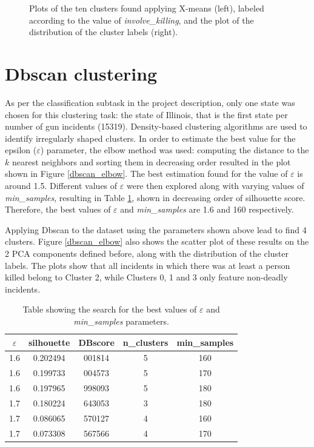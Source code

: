 \documentclass[10pt,a4paper]{report}
\begin{document}
\begin{figure}[h]
\begin{minipage}{0.25\textwidth}
		\vspace{0.8cm}
	\end{minipage}
		\caption{Plots of the ten clusters found applying X-means (left), labeled according to the value of \textit{involve\_killing}, and the plot of the distribution of the cluster labels (right).}
		\label{xmeans_killing}
\end{figure}

\section{Dbscan clustering}

As per the classification subtask in the project description, only one state was chosen for this clustering task: the state of Illinois, that is the first state per number of gun incidents (15319).
Density-based clustering algorithms are used to identify irregularly shaped clusters.
In order to estimate the best value for the epsilon ($\varepsilon$) parameter, the elbow method was used: computing the distance to the $k$ nearest neighbors and sorting them in decreasing order resulted in the plot shown in Figure \ref{dbscan_elbow}.
The best estimation found for the value of $\varepsilon$ is around 1.5.
Different values of $\varepsilon$ were then explored along with varying values of \textit{min\_samples}, resulting in Table \ref{table02}, shown in decreasing order of silhouette score.
Therefore, the best values of $\varepsilon$ and \textit{min\_samples} are 1.6 and 160 respectively.

Applying Dbscan to the dataset using the parameters shown above lead to  find 4 clusters.
Figure \ref{dbscan_elbow} also shows the scatter plot of these results on the 2 PCA components defined before, along with the distribution of the cluster labels.
The plots show that all incidents in which there was at least a person killed belong to Cluster 2, while Clusters 0, 1 and 3 only feature non-deadly incidents.
\begin{table}[h]
	\centering
	\begin{small}
		\begin{tabular}{c|c|c|c|c}
			\textbf{$\varepsilon$} & \textbf{silhouette} & \textbf{DBscore} & \textbf{n\_clusters} & \textbf{min\_samples}\\
			\hline
			1.6 & 0.202494 & 001814 & 5 & 160\\
			1.6 & 0.199733 & 004573 & 5 & 170\\
			1.6 & 0.197965 & 998093 & 5 & 180\\
			1.7 & 0.180224 & 643053 & 3 & 180\\
			1.7 & 0.086065 & 570127 & 4 & 160\\
			1.7 & 0.073308 & 567566 & 4 & 170\\
	\end{tabular}
	\end{small}
	\caption{Table showing the search for the best values of $\varepsilon$ and \textit{min\_samples} parameters.}
	\label{table02}
\end{table}
\end{document}

